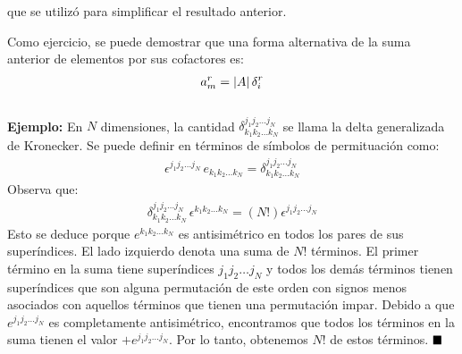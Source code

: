 \documentclass[hidelinks,12pt]{article}
\renewcommand{\qed}{\hfill\blacksquare}
\begin{document}
que se utilizó para simplificar el resultado anterior.
\par
Como ejercicio, se puede demostrar que una forma alternativa de la suma anterior de elementos por sus cofactores es:
\begin{align*}
a_{m}^{r} = \abs{A} \, \delta_{i}^{r}
\end{align*}
\\[0.5em]
\noindent
\textbf{Ejemplo: } En $N$ dimensiones, la cantidad $\displaystyle \delta_{k_{1} k_{2} \ldots k_{N}}^{j_{1} j_{2} \ldots j_{N}}$ se llama la delta generalizada de Kronecker. Se puede definir en términos de símbolos de permituación como:
\begin{align}
\epsilon^{j_{1} j_{2} \ldots j_{N}} \, e_{k_{1} k_{2} \ldots k_{N}} = \delta_{k_{1} k_{2} \ldots k_{N}}^{j_{1} j_{2} \ldots j_{N}}
\label{eq:ecuacion_01_01_26}
\end{align}
Observa que:
\begin{align*}
\delta_{k_{1} k_{2} \ldots k_{N}}^{j_{1} j_{2} \ldots j_{N}} \, \epsilon^{k_{1} k_{2} \ldots k_{N}} = \left( N! \right) \epsilon^{j_{1} j_{2} \ldots j_{N}}
\end{align*}
Esto se deduce porque $e^{k_{1} k_{2} \ldots k_{N}}$ es antisimétrico en todos los pares de sus superíndices. El lado izquierdo denota una suma de $N!$ términos. El primer término en la suma tiene superíndices $j_{1} j_{2} \ldots j_{N}$ y todos los demás términos tienen superíndices que son alguna permutación de este orden con signos menos asociados con aquellos términos que tienen una permutación impar. Debido a que $e^{j_{1} j_{2} \ldots j_{N}}$ es completamente antisimétrico, encontramos que todos los términos en la suma tienen el valor $+e^{j_{1} j_{2} \ldots j_{N}}$. Por lo tanto, obtenemos $N!$ de estos términos. \hspace{5cm} $\qed$
\end{document}

